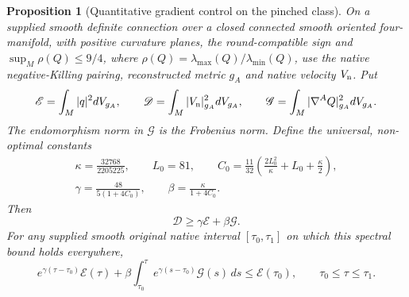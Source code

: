 \documentclass[11pt]{article}
\numberwithin{equation}{section}
\newtheorem{proposition}[theorem]{Proposition}
\theoremstyle{definition}
\theoremstyle{remark}
\begin{document}
\begin{proposition}[Quantitative gradient control on the pinched class]
\label{prop:pinched-gradient-domination}
On a supplied smooth definite connection over a closed connected
smooth oriented four-manifold, with positive curvature planes,
the round-compatible sign and $\sup_M\rho(Q)\le9/4$, where
$\rho(Q)=\lambda_{\max}(Q)/\lambda_{\min}(Q)$, use the
native negative-Killing pairing, reconstructed metric $g_A$
and native velocity $V_{\rm n}$. Put
\[
 \mathscr E=\int_M|q|^2dV_{g_A},\qquad
 \mathscr D=\int_M|V_{\rm n}|_{g_A}^2dV_{g_A},\qquad
 \mathscr G=\int_M|\nabla^AQ|_{g_A}^2dV_{g_A}.
\]
The endomorphism norm in $\mathscr G$ is the Frobenius norm.
Define the universal, non-optimal constants
\begin{equation}\label{eq:pinched-gradient-constants}
 \begin{gathered}
 \kappa=\frac{32768}{2205225},\qquad L_0=81,\qquad
 C_0=\frac{11}{32}\left(\frac{2L_0^2}{\kappa}+L_0+\frac\kappa2\right),\\
 \gamma=\frac{48}{5(1+4C_0)},\qquad
 \beta=\frac{\kappa}{1+4C_0}.
 \end{gathered}
\end{equation}
Then
\begin{equation}\label{eq:pinched-gradient-domination}
 \mathscr D\ge\gamma\mathscr E+\beta\mathscr G.
\end{equation}
For any supplied smooth original native interval
$[\tau_0,\tau_1]$ on which this spectral bound holds everywhere,
\begin{equation}\label{eq:pinched-native-energy-decay}
 e^{\gamma(\tau-\tau_0)}\mathscr E(\tau)
 +\beta\int_{\tau_0}^{\tau}e^{\gamma(s-\tau_0)}
                                   \mathscr G(s)\,ds
 \le\mathscr E(\tau_0),\qquad \tau_0\le\tau\le\tau_1.
\end{equation}
\end{proposition}
\end{document}
